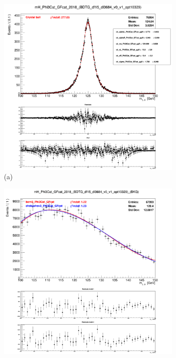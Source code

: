 \begin{figure}[!ht]
    \captionsetup[subfigure]{labelformat=empty}
    \vspace*{-0.2cm}
    \centering
    \setlength{\mylength}{\textwidth}
    \begin{subfigure}[t]{0.50\mylength}
        \centering
        \includegraphics[width=0.45\mylength]{resources/plots/Phi3_fit_SGN.png}
        \caption{\footnotesize (a)}
    \end{subfigure}%
    \begin{subfigure}[t]{0.50\mylength}
        \centering
        \includegraphics[width=0.45\mylength]{resources/plots/Phi3_fit_BKG.png}

\end{subfigure}
\end{figure}
